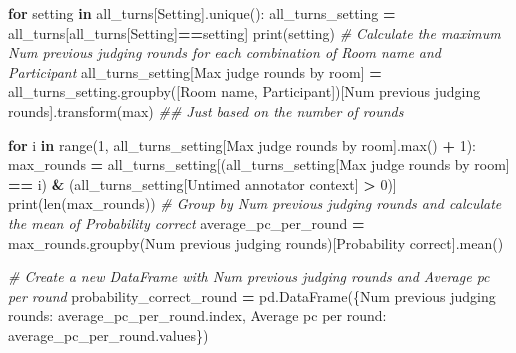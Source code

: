 \documentclass[
]{article}
\newenvironment{Shaded}{\begin{snugshade}}{\end{snugshade}}
\newcommand{\BuiltInTok}[1]{#1}
\newcommand{\CommentTok}[1]{\textcolor[rgb]{0.56,0.35,0.01}{\textit{#1}}}
\newcommand{\ControlFlowTok}[1]{\textcolor[rgb]{0.13,0.29,0.53}{\textbf{#1}}}
\newcommand{\DecValTok}[1]{\textcolor[rgb]{0.00,0.00,0.81}{#1}}
\newcommand{\KeywordTok}[1]{\textcolor[rgb]{0.13,0.29,0.53}{\textbf{#1}}}
\newcommand{\NormalTok}[1]{#1}
\newcommand{\OperatorTok}[1]{\textcolor[rgb]{0.81,0.36,0.00}{\textbf{#1}}}
\newcommand{\StringTok}[1]{\textcolor[rgb]{0.31,0.60,0.02}{#1}}
\begin{document}
\begin{Shaded}
\begin{Highlighting}[]
\ControlFlowTok{for}\NormalTok{ setting }\KeywordTok{in}\NormalTok{ all\_turns[}\StringTok{\textquotesingle{}Setting\textquotesingle{}}\NormalTok{].unique():}
\NormalTok{  all\_turns\_setting }\OperatorTok{=}\NormalTok{ all\_turns[all\_turns[}\StringTok{\textquotesingle{}Setting\textquotesingle{}}\NormalTok{]}\OperatorTok{==}\NormalTok{setting]}
  \BuiltInTok{print}\NormalTok{(setting)}
  \CommentTok{\# Calculate the maximum \textquotesingle{}Num previous judging rounds\textquotesingle{} for each combination of \textquotesingle{}Room name\textquotesingle{} and \textquotesingle{}Participant\textquotesingle{}}
\NormalTok{  all\_turns\_setting[}\StringTok{\textquotesingle{}Max judge rounds by room\textquotesingle{}}\NormalTok{] }\OperatorTok{=}\NormalTok{ all\_turns\_setting.groupby([}\StringTok{\textquotesingle{}Room name\textquotesingle{}}\NormalTok{, }\StringTok{\textquotesingle{}Participant\textquotesingle{}}\NormalTok{])[}\StringTok{\textquotesingle{}Num previous judging rounds\textquotesingle{}}\NormalTok{].transform(}\StringTok{\textquotesingle{}max\textquotesingle{}}\NormalTok{)}
  \CommentTok{\#\# Just based on the number of rounds}
  
  \ControlFlowTok{for}\NormalTok{ i }\KeywordTok{in} \BuiltInTok{range}\NormalTok{(}\DecValTok{1}\NormalTok{, all\_turns\_setting[}\StringTok{\textquotesingle{}Max judge rounds by room\textquotesingle{}}\NormalTok{].}\BuiltInTok{max}\NormalTok{() }\OperatorTok{+} \DecValTok{1}\NormalTok{):}
\NormalTok{      max\_rounds }\OperatorTok{=}\NormalTok{ all\_turns\_setting[(all\_turns\_setting[}\StringTok{\textquotesingle{}Max judge rounds by room\textquotesingle{}}\NormalTok{] }\OperatorTok{==}\NormalTok{ i) }\OperatorTok{\&}\NormalTok{ (all\_turns\_setting[}\StringTok{\textquotesingle{}Untimed annotator context\textquotesingle{}}\NormalTok{] }\OperatorTok{\textgreater{}} \DecValTok{0}\NormalTok{)]}
      \BuiltInTok{print}\NormalTok{(}\BuiltInTok{len}\NormalTok{(max\_rounds))}
      \CommentTok{\# Group by \textquotesingle{}Num previous judging rounds\textquotesingle{} and calculate the mean of \textquotesingle{}Probability correct\textquotesingle{}}
\NormalTok{      average\_pc\_per\_round }\OperatorTok{=}\NormalTok{ max\_rounds.groupby(}\StringTok{\textquotesingle{}Num previous judging rounds\textquotesingle{}}\NormalTok{)[}\StringTok{\textquotesingle{}Probability correct\textquotesingle{}}\NormalTok{].mean()}
  
      \CommentTok{\# Create a new DataFrame with \textquotesingle{}Num previous judging rounds\textquotesingle{} and \textquotesingle{}Average pc per round\textquotesingle{}}
\NormalTok{      probability\_correct\_round }\OperatorTok{=}\NormalTok{ pd.DataFrame(\{}\StringTok{\textquotesingle{}Num previous judging rounds\textquotesingle{}}\NormalTok{: average\_pc\_per\_round.index,}
                                                \StringTok{\textquotesingle{}Average pc per round\textquotesingle{}}\NormalTok{: average\_pc\_per\_round.values\})}
  

\end{Highlighting}
\end{Shaded}
\end{document}
